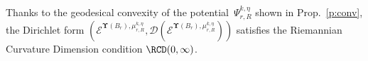 \documentclass[11pt,letterpaper]{amsart}
\newcommand{\Ch}{\mathsf{Ch}}
\newcommand{\dom}[1]{\mathcal D(#1)}
\newcommand{\diff}{\mathop{}\!\mathrm{d}}
\newcommand{\R}{{\mathbb R}}
\newcommand{\comma}{\,\,\mathrm{,}\;\,}
\newcommand{\dUpsilon}{{\mathbf \Upsilon}}
\newcommand{\U}{\dUpsilon}
\newcommand{\E}{\mathcal E}
\newcommand{\F}{\mathcal F}
\renewcommand{\1}{\mathbf 1}
\numberwithin{equation}{section}
\theoremstyle{plain}
\theoremstyle{definition}
\newtheorem{defs}[thm]{Definition}%
\theoremstyle{remark}
\begin{document}
Thanks to the geodesical convexity of the potential~$\Psi_{r, R}^{k, \eta}$ shown in Prop.~\ref{p:conv}, the Dirichlet form $(\E^{\U(B_r), \mu_{r, R}^{k, \eta}}, \dom{\E^{\U(B_r), \mu_{r, R}^{k, \eta}}})$ satisfies the Riemannian Curvature Dimension condition $\RCD(0,\infty)$. 
 
\end{document}
